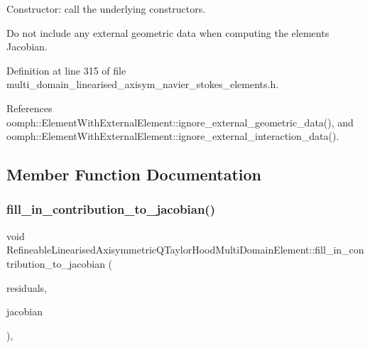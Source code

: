 Constructor\+: call the underlying constructors. 

Do not include any external geometric data when computing the element\textquotesingle{}s Jacobian. 

Definition at line 315 of file multi\+\_\+domain\+\_\+linearised\+\_\+axisym\+\_\+navier\+\_\+stokes\+\_\+elements.\+h.



References oomph\+::\+Element\+With\+External\+Element\+::ignore\+\_\+external\+\_\+geometric\+\_\+data(), and oomph\+::\+Element\+With\+External\+Element\+::ignore\+\_\+external\+\_\+interaction\+\_\+data().



\subsection{Member Function Documentation}
\mbox{\label{classRefineableLinearisedAxisymmetricQTaylorHoodMultiDomainElement_a057d824e17f4e7ed12b496629dfe67fd}} 
\subsubsection{\texorpdfstring{fill\+\_\+in\+\_\+contribution\+\_\+to\+\_\+jacobian()}{fill\_in\_contribution\_to\_jacobian()}}
{\footnotesize\ttfamily void Refineable\+Linearised\+Axisymmetric\+Q\+Taylor\+Hood\+Multi\+Domain\+Element\+::fill\+\_\+in\+\_\+contribution\+\_\+to\+\_\+jacobian (\begin{DoxyParamCaption}\item[{\hyperlink{classoomph_1_1Vector}{Vector}$<$ double $>$ \&}]{residuals,  }\item[{\hyperlink{classoomph_1_1DenseMatrix}{Dense\+Matrix}$<$ double $>$ \&}]{jacobian }\end{DoxyParamCaption})\hspace{0.3cm}{\ttfamily [inline]}, {\ttfamily [virtual]}}



